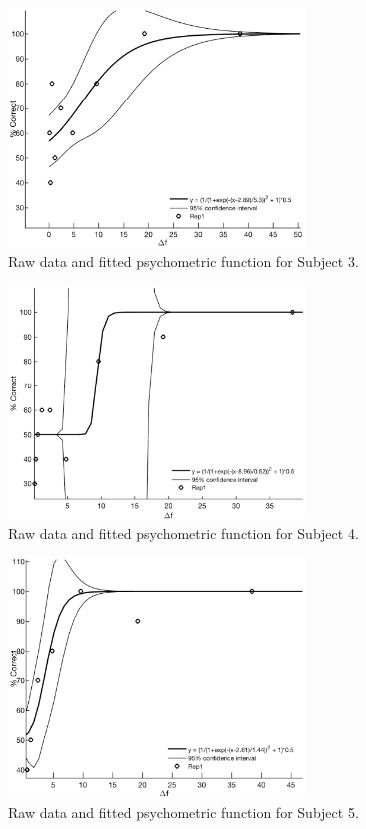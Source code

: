 \begin{figure}[H]
\centering
\includegraphics[width = 0.7\textwidth]{Figure/Vores_Figurer/Subject3} 
\caption{Raw data and fitted psychometric function for Subject 3.}
\label{fig:Subject3}
\end{figure}
%
\begin{figure}[H]
\centering
\includegraphics[width = 0.7\textwidth]{Figure/Vores_Figurer/Subject4} 
\caption{Raw data and fitted psychometric function for Subject 4.}
\label{fig:Subject4}
\end{figure}
%
\begin{figure}[H]
\centering
\includegraphics[width = 0.7\textwidth]{Figure/Vores_Figurer/Subject5} 
\caption{Raw data and fitted psychometric function for Subject 5.}
\label{fig:Subject5}
\end{figure}

